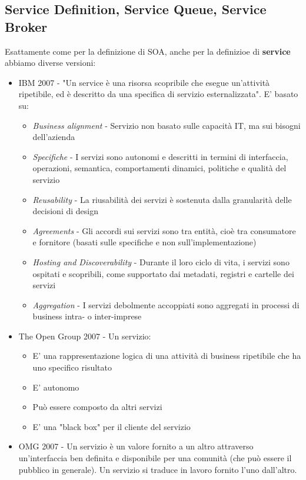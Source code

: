 \documentclass{article}
\begin{document}
\subsection{Service Definition, Service Queue, Service Broker}
Esattamente come per la definizione di SOA, anche per la definizioe di \textbf{service} abbiamo diverse versioni:
\begin{itemize}
    \item IBM 2007 - "Un service è una risorsa scopribile che esegue un'attività ripetibile, ed è descritto da una specifica di servizio esternalizzata". E' basato su:
    \begin{itemize}
        \item \textit{Business alignment} - Servizio non basato sulle capacità IT, ma sui bisogni dell'azienda
        \item \textit{Specifiche} - I servizi sono autonomi e descritti in termini di interfaccia, operazioni, semantica, comportamenti dinamici, politiche e qualità del servizio
        \item \textit{Reusability} - La riusabilità dei servizi è sostenuta dalla granularità delle decisioni di design
        \item \textit{Agreements} - Gli accordi sui servizi sono tra entità, cioè tra consumatore e fornitore (basati sulle specifiche e non sull'implementazione)
        \item \textit{Hosting and Discoverability} - Durante il loro ciclo di vita, i servizi sono ospitati e scopribili, come supportato dai metadati, registri e cartelle dei servizi
        \item \textit{Aggregation} - I servizi debolmente accoppiati sono aggregati in processi di business intra- o inter-imprese
    \end{itemize}
    \item The Open Group 2007 - Un servizio:
    \begin{itemize}
        \item E' una rappresentazione logica di una attività di business ripetibile che ha uno specifico risultato
        \item E' autonomo
        \item Può essere composto da altri servizi
        \item E' una "black box" per il cliente del servizio
    \end{itemize}
    \item OMG 2007 - Un servizio è un valore fornito a un altro attraverso un'interfaccia ben definita e disponibile per una comunità (che può essere il pubblico in generale).
    Un servizio si traduce in lavoro fornito l'uno dall'altro.
\end{itemize}
\end{document}
